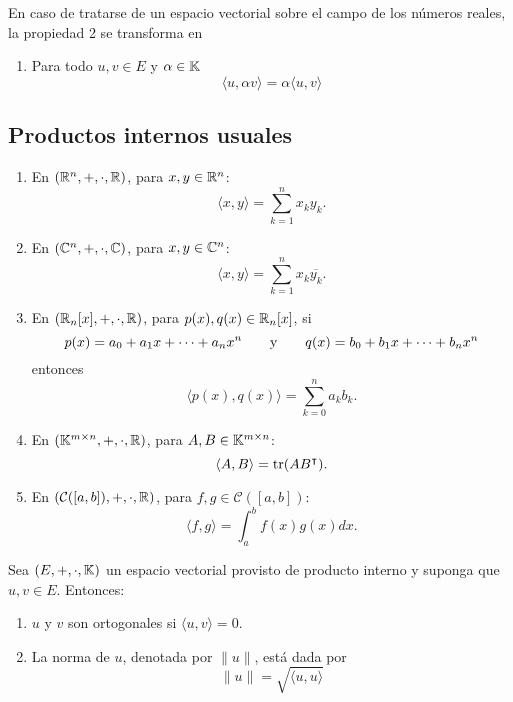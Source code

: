 \documentclass[a4,11pt]{aleph-notas}
\begin{document}
\begin{advertencia}
    En caso de tratarse de un espacio vectorial sobre el campo de los números reales, la propiedad 2 se transforma en
    \begin{enumerate}[start=2]
        \item
            Para todo $u,v \in E$ y $\alpha \in \K$
            \[\langle u, \alpha v\rangle =  \alpha\langle u,v\rangle\]
    \end{enumerate}
\end{advertencia}

\subsection{Productos internos usuales}

\begin{enumerate}
    \item En $(\R^n,+, \cdot, \R)$, para $x,y\in \R^n$:
    \[
        \langle x, y \rangle = \sum_{k=1}^n x_k y_k.
    \]
    
    \item En $(\C^n,+, \cdot, \C)$, para $x,y\in \C^n$:
    \[
        \langle x, y \rangle = \sum_{k=1}^n x_k \overline{y_k}.
    \]
    
    \item En $(\R_n[x],+, \cdot, \R)$, para $p(x),q(x)\in \R_n[x]$, si 
    \[  
        p(x) = a_0 + a_1x + \cdots + a_nx^n
        \texty
        q(x) = b_0 + b_1x + \cdots + b_nx^n
    \]
    entonces
    \[
        \langle p(x), q(x) \rangle = \sum_{k=0}^n a_k b_k.
    \]
    
    \item En $(\Mat[\K]{m}{n},+, \cdot, \R)$, para $A,B\in \Mat[\K]{m}{n}$:
    \[
        \langle A, B \rangle = \tr(AB^\intercal).
    \]
    
    \item En $(\mathcal{C}([a,b]),+, \cdot, \R)$, para $f,g\in \mathcal{C}([a,b])$:
    \[
        \langle f, g \rangle = \int_a^b f(x) g(x) dx.
    \]
    \end{enumerate}

\begin{defi}
Sea $(E,+,\cdot,\K)$ un espacio vectorial provisto de producto interno y suponga que $u, v \in E$.
Entonces:
\begin{enumerate}
    \item $u$ y $v$ son ortogonales si $\langle u, v \rangle = 0$.
    \item La norma de $u$, denotada por $\|u \|$, está dada por
    \[
        \| u\| = \sqrt{\langle u, u \rangle}
    \]
\end{enumerate}
\end{defi}
\end{document}
